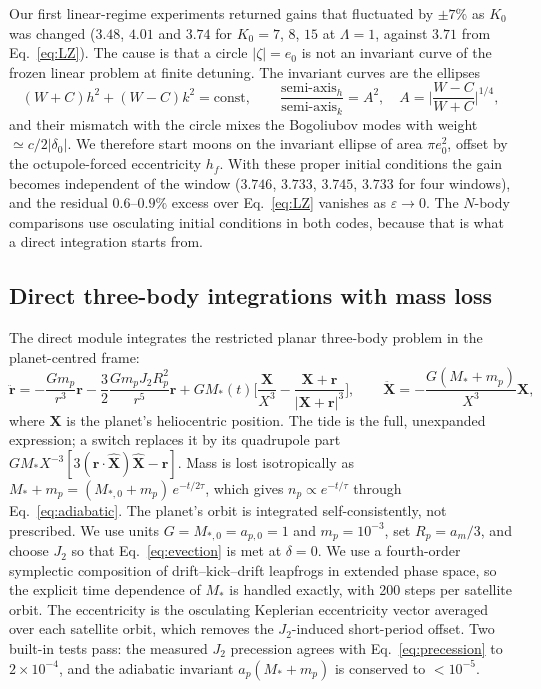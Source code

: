 \documentclass[11pt,a4paper]{article}
\newcommand{\eps}{\varepsilon}
\begin{document}
Our first linear-regime experiments returned gains that fluctuated by $\pm7\%$ as $K_0$ was changed ($3.48$, $4.01$ and $3.74$ for $K_0=7$, $8$, $15$ at $\Lambda=1$, against $3.71$ from Eq.~\eqref{eq:LZ}). The cause is that a circle $|\zeta|=e_0$ is not an invariant curve of the frozen linear problem at finite detuning. The invariant curves are the ellipses
\begin{equation}
(W+C)h^2+(W-C)k^2=\text{const},\qquad \frac{\text{semi-axis}_h}{\text{semi-axis}_k}=A^2,\quad A=\Big|\frac{W-C}{W+C}\Big|^{1/4},
\label{eq:proper}
\end{equation}
and their mismatch with the circle mixes the Bogoliubov modes with weight $\simeq c/2|\delta_0|$. We therefore start moons on the invariant ellipse of area $\pi e_0^2$, offset by the octupole-forced eccentricity $h_f$. With these proper initial conditions the gain becomes independent of the window ($3.746$, $3.733$, $3.745$, $3.733$ for four windows), and the residual $0.6$--$0.9\%$ excess over Eq.~\eqref{eq:LZ} vanishes as $\eps\to0$. The $N$-body comparisons use osculating initial conditions in both codes, because that is what a direct integration starts from.

\subsection{Direct three-body integrations with mass loss}

The direct module integrates the restricted planar three-body problem in the planet-centred frame:
\begin{equation}
\ddot{\bm r}=-\frac{Gm_p}{r^3}\bm r-\frac{3}{2}\frac{Gm_pJ_2R_p^2}{r^5}\bm r+GM_\ast(t)\Big[\frac{\bm X}{X^3}-\frac{\bm X+\bm r}{|\bm X+\bm r|^3}\Big],\qquad
\ddot{\bm X}=-\frac{G(M_\ast+m_p)}{X^3}\bm X,
\label{eq:nbody}
\end{equation}
where $\bm X$ is the planet's heliocentric position. The tide is the full, unexpanded expression; a switch replaces it by its quadrupole part $GM_\ast X^{-3}[3(\bm r\cdot\hat{\bm X})\hat{\bm X}-\bm r]$. Mass is lost isotropically as $M_\ast+m_p=(M_{\ast,0}+m_p)\,e^{-t/2\tau}$, which gives $n_p\propto e^{-t/\tau}$ through Eq.~\eqref{eq:adiabatic}. The planet's orbit is integrated self-consistently, not prescribed. We use units $G=M_{\ast,0}=a_{p,0}=1$ and $m_p=10^{-3}$, set $R_p=a_m/3$, and choose $J_2$ so that Eq.~\eqref{eq:evection} is met at $\delta=0$. We use a fourth-order symplectic composition of drift--kick--drift leapfrogs \citep{Yoshida1990} in extended phase space, so the explicit time dependence of $M_\ast$ is handled exactly, with 200 steps per satellite orbit. The eccentricity is the osculating Keplerian eccentricity vector averaged over each satellite orbit, which removes the $J_2$-induced short-period offset. Two built-in tests pass: the measured $J_2$ precession agrees with Eq.~\eqref{eq:precession} to $2\times10^{-4}$, and the adiabatic invariant $a_p(M_\ast+m_p)$ is conserved to $<10^{-5}$.
\end{document}
